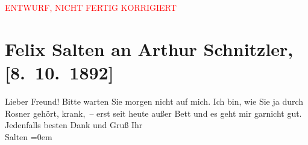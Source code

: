 
\begin{center}
            \textcolor{red}{ENTWURF, NICHT FERTIG KORRIGIERT}
                      \end{center}
            
         
         \renewcommand{\erwaehntePersonen}{Personen: Karl Peter Rosner}
         \renewcommand{\erwaehnteOrte}{Orte: Wien}
         \renewcommand{\erwaehnteWerke}{}
               \section[Felix Salten an Arthur Schnitzler, {[}8. 10. 1892{]}]{ Felix Salten an Arthur Schnitzler, {[}8. 10. 1892{]}}\nopagebreak{}\rehead{ }\begin{ledgroupsized}[t]{13cm}\normalsize\beginnumbering \toendnotes[C]{\smallbreak\pagebreak[2]} 
\toendnotes[C]{\smallbreak}\pstart
           \noindent{}{\pb}Lieber Freund! Bitte warten Sie morgen nicht auf mich. Ich bin, wie
               Sie ja \label{K_L03115-1v}\label{K_L03115-1h} durch Rosner
               gehört, krank, – erst seit heute außer Bett und es geht mir garnicht gut. \pend
           \pstart
           Jedenfalls besten Dank und Gruß \pend
           \pstart
           Ihr {\\[\baselineskip]}\spacefill\mbox{Salten}\pend
           \leftskip=0em{}
         
         \endnumbering{}\end{ledgroupsized}\begin{anhang}\end{anhang}\newcommand{\dateiname}{L03115}\newcommand{\titel}{Felix Salten an Arthur Schnitzler, [8. 10. 1892]}\newcommand{\editorInnen}{Martin Anton Müller und Laura Untner}
      
